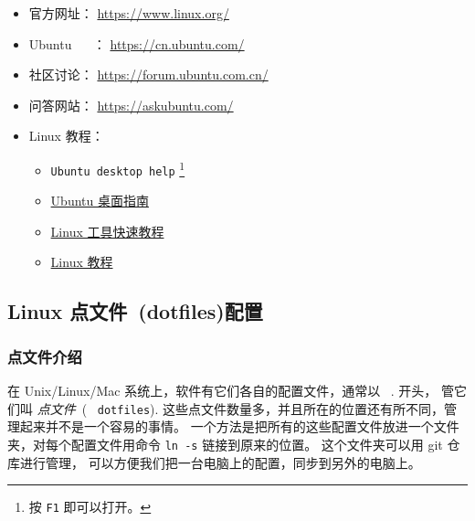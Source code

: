 \documentclass[
    11pt,
    cite=authoryear,
    device=normal,
    lang=cn,
    mode=simple,
    result=answer,
    toc=onecol,
]{elegantbook_sierxue}
\begin{document}
\begin{itemize}
    \item 官方网址： \href{https://www.linux.org/}{https://www.linux.org/}
    \item Ubuntu ~ ~： \href{https://cn.ubuntu.com/}{https://cn.ubuntu.com/}
    \item 社区讨论：
        \href{https://forum.ubuntu.com.cn/}{https://forum.ubuntu.com.cn/}
    \item 问答网站：
        \href{https://askubuntu.com/}{https://askubuntu.com/}
    \item Linux 教程：
        \begin{itemize}
            \item \lstinline{Ubuntu desktop help}
                \footnote{按 \lstinline{F1} 即可以打开。}
            \item \href{https://help.ubuntu.com/lts/ubuntu-help/index.html}
                {Ubuntu 桌面指南}
            \item \href{https://linuxtools-rst.readthedocs.io/zh_CN/latest/}
                {Linux 工具快速教程}
            \item \href{https://dunwu.github.io/linux-tutorial/#/}
                {Linux 教程}
        \end{itemize}
\end{itemize}



\subsection{Linux 点文件~(dotfiles)配置}%
\label{sub:dotfiles-settings}

\subsubsection{点文件介绍}%
\label{ssub:dotfiles-settings-intro}

在 Unix/Linux/Mac 系统上，软件有它们各自的配置文件，通常以 ~.  开头，
管它们叫 \emph{点文件}~(~ \texttt{dotfiles}).
这些点文件数量多，并且所在的位置还有所不同，管理起来并不是一个容易的事情。
一个方法是把所有的这些配置文件放进一个文件夹，对每个配置文件用命令
\lstinline{ln -s} 链接到原来的位置。
这个文件夹可以用 git 仓库进行管理，
可以方便我们把一台电脑上的配置，同步到另外的电脑上。
\end{document}

